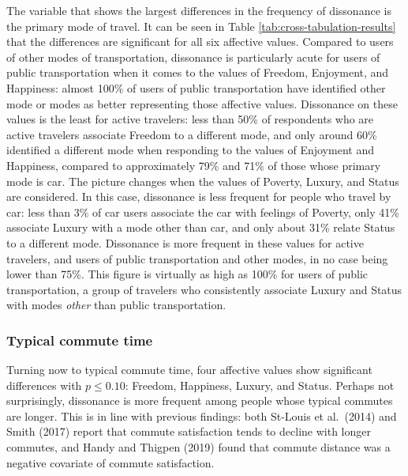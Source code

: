 \documentclass[]{elsarticle} %
\begin{document}
The variable that shows the largest differences in the frequency of
dissonance is the primary mode of travel. It can be seen in Table
\ref{tab:cross-tabulation-results} that the differences are significant
for all six affective values. Compared to users of other modes of
transportation, dissonance is particularly acute for users of public
transportation when it comes to the values of Freedom, Enjoyment, and
Happiness: almost 100\% of users of public transportation have
identified other mode or modes as better representing those affective
values. Dissonance on these values is the least for active travelers:
less than 50\% of respondents who are active travelers associate Freedom
to a different mode, and only around 60\% identified a different mode
when responding to the values of Enjoyment and Happiness, compared to
approximately 79\% and 71\% of those whose primary mode is car. The
picture changes when the values of Poverty, Luxury, and Status are
considered. In this case, dissonance is less frequent for people who
travel by car: less than 3\% of car users associate the car with
feelings of Poverty, only 41\% associate Luxury with a mode other than
car, and only about 31\% relate Status to a different mode. Dissonance
is more frequent in these values for active travelers, and users of
public transportation and other modes, in no case being lower than 75\%.
This figure is virtually as high as 100\% for users of public
transportation, a group of travelers who consistently associate Luxury
and Status with modes \emph{other} than public transportation.

\hypertarget{typical-commute-time}{%
\subsubsection{Typical commute time}\label{typical-commute-time}}

Turning now to typical commute time, four affective values show
significant differences with \(p\leq0.10\): Freedom, Happiness, Luxury,
and Status. Perhaps not surprisingly, dissonance is more frequent among
people whose typical commutes are longer. This is in line with previous
findings: both St-Louis et al.~(2014) and Smith (2017) report that
commute satisfaction tends to decline with longer commutes, and Handy
and Thigpen (2019) found that commute distance was a negative covariate
of commute satisfaction.
\end{document}
